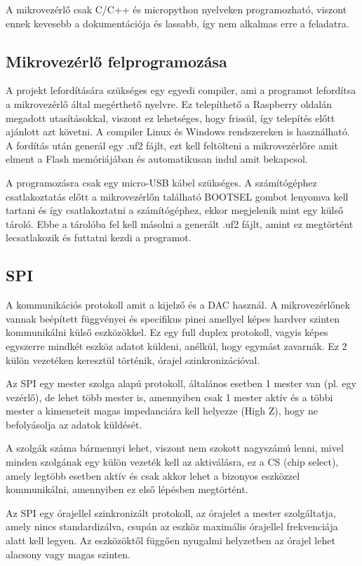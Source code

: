 A mikrovezérlő csak C/C++ és micropython nyelveken programozható, viszont ennek
kevesebb a dokumentációja és lassabb, így nem alkalmas erre a feladatra.


\subsection{Mikrovezérlő felprogramozása}

A projekt lefordítására szükséges egy egyedi compiler, ami a programot lefordítsa
a mikrovezérlő által megérthető nyelvre. Ez telepíthető a Raspberry oldalán megadott 
utasításokkal, viszont ez lehetséges, hogy frissül, így telepítés előtt ajánlott
azt követni. A compiler Linux és Windows rendszereken is használható. A fordítás után
generál egy .uf2 fájlt, ezt kell feltölteni a mikrovezérlőre amit elment a Flash
memóriájában és automatikusan indul amit bekapcsol.

A programozásra csak egy micro-USB kábel szükséges. A számítógéphez csatlakoztatás előtt
a mikrovezérlőn található BOOTSEL gombot lenyomva kell tartani és így csatlakoztatni a
számítógéphez, ekkor megjelenik mint egy külső tároló. Ebbe a tárolóba fel kell másolni
a generált .uf2 fájlt, amint ez megtörtént lecsatlakozik és futtatni kezdi a programot.


\subsection{SPI}

A kommunikációs protokoll amit a kijelző és a DAC használ. A mikrovezérlőnek vannak
beépített függvényei és specifikus pinei amellyel képes hardver szinten kommunikálni
külső eszközökkel. Ez egy full duplex protokoll, vagyis képes egyszerre mindkét eszköz
adatot küldeni, anélkül, hogy egymást zavarnák. Ez 2 külön vezetéken
keresztül történik, órajel szinkronizációval.

Az SPI egy mester szolga alapú protokoll, általános esetben 1 mester van (pl. egy 
vezérlő), de lehet több mester is, amennyiben csak 1 mester aktív és a többi mester
a kimeneteit magas impedanciára kell helyezze (High Z), hogy ne befolyásolja az 
adatok küldését. 


A szolgák száma bármennyi lehet, viszont nem szokott nagyszámú lenni, mivel minden
szolgának egy külön vezeték kell az aktiválásra, ez a CS (chip select), amely 
legtöbb esetben aktív és csak akkor lehet a bizonyos eszközzel kommunikálni, amennyiben
ez első lépésben megtörtént.

Az SPI egy órajellel szinkronizált protokoll, az órajelet a mester szolgáltatja,
amely nincs standardizálva, csupán az eszköz maximális órajellel frekvenciája 
alatt kell legyen. Az eszközöktől függően nyugalmi helyzetben az órajel lehet alacsony
vagy magas szinten.

